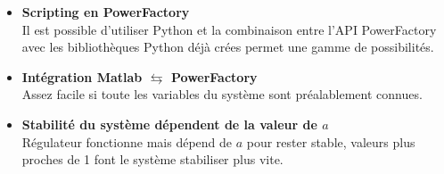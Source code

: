 \begin{itemize}
	\item \textbf{Scripting en PowerFactory}\\
	Il est possible d'utiliser Python et la combinaison entre l'API PowerFactory avec les bibliothèques Python déjà crées permet une gamme de possibilités.\\
	\item \textbf{Intégration Matlab $\mathbf{\leftrightarrows }$ PowerFactory}\\
	Assez facile si toute les variables du système sont préalablement connues.\\
	\item \textbf{Stabilité du système dépendent de la valeur de $ a $}\\
	Régulateur fonctionne mais dépend de $ a $ pour rester stable, valeurs plus proches de 1 font le système stabiliser plus vite.
	
\end{itemize}